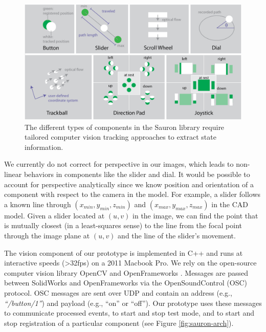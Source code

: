 \begin{figure}
\centering
\includegraphics[width=\textwidth]{figures/sauron/vision-all-components.png}
\caption{The different types of components in the Sauron library require tailored computer vision tracking approaches to extract state information.}
\label{fig:sauron-vision}
\end{figure}

We currently do not correct for perspective in our images, which leads to non-linear behaviors in components like the slider and dial. It would be possible to account for perspective analytically since we know position and orientation of a component with respect to the camera in the model. For example, a slider follows a known line through $(x_{min}, y_{min},z_{min})$ and $(x_{max},y_{max},z_{max})$ in the CAD model.
Given a slider located at $(u,v)$ in the image, we can find the point that is mutually closest (in a least-squares sense) to the line from the focal point through the image plane at $(u,v)$ and the line of the slider's movement.

The vision component of our prototype is implemented in C++ and runs at interactive speeds (\textgreater 32fps) on a 2011 Macbook Pro. We rely on the open-source computer vision library OpenCV \cite{opencv} and OpenFrameworks \cite{openframeworks}.
Messages are passed between SolidWorks and OpenFrameworks via the OpenSoundControl (OSC) protocol. OSC messages are sent over UDP and contain an address (e.g., {\em ``/button/1''}) and payload (e.g., ``on'' or ``off''). Our prototype uses these messages to communicate processed events, to start and stop test mode, and to start and stop registration of a particular component (see Figure \ref{fig:sauron-arch}).

